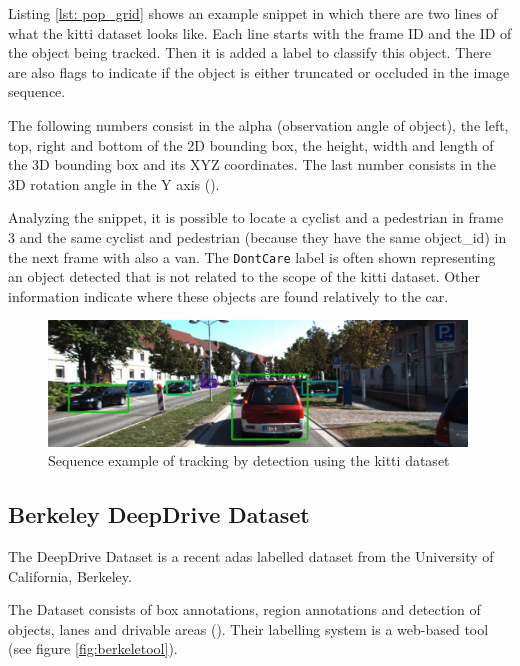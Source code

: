 Listing \ref{lst: pop_grid} shows an example snippet in which there are two lines of what the \gls{kitti} dataset looks like. Each line starts with the frame ID and the ID of the object being tracked. Then it is added a label to classify this object. There are also flags to indicate if the object is either truncated or occluded in the image sequence. 

The following numbers consist in the alpha (observation angle of object), the left, top, right and bottom of the 2D bounding box, the height, width and length of the 3D bounding box and its XYZ coordinates. The last number consists in the 3D rotation angle in the Y axis (\cite{Team}).

Analyzing the snippet, it is possible to locate a cyclist and a pedestrian in frame 3 and the same cyclist and pedestrian (because they have the same object\_id) in the next frame with also a van. The \texttt{DontCare} label is often shown representing an object detected that is not related to the scope of the \gls{kitti} dataset. Other information indicate where these objects are found relatively to the car.

\begin{figure}[htp]
	
	\centering
	\includegraphics[width=0.99\textwidth]{capstate/imgs/kittiresult}
	
	\caption{Sequence example of tracking by detection using the \gls{kitti} dataset}
	\label{fig:kittiresult}
	
\end{figure}

\subsection{Berkeley DeepDrive Dataset}

The DeepDrive Dataset is a recent \gls{adas} labelled dataset from the University of California, Berkeley.

The Dataset consists of box annotations, region annotations and detection of objects, lanes and drivable areas (\cite{Yu2018}). Their labelling system is a web-based tool (see figure \ref{fig:berkeletool}). 


